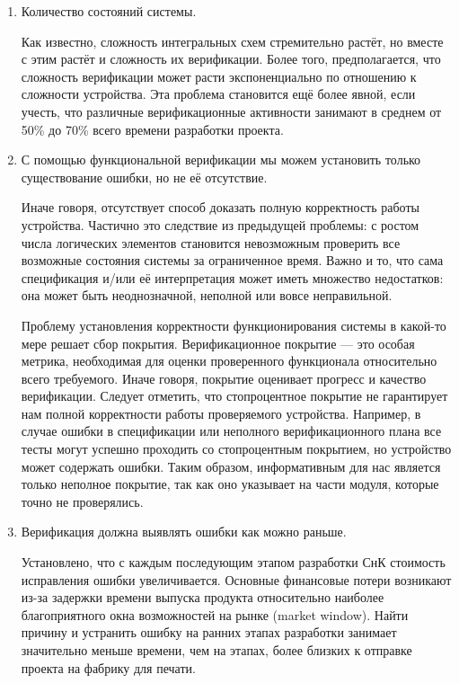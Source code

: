 \begin{enumerate}
	\item Количество состояний системы.
	
	Как известно, сложность интегральных схем стремительно растёт\cite{moore}, но вместе с этим растёт и сложность их верификации. Более того, предполагается, что сложность верификации может расти экспоненциально по отношению к сложности устройства\cite{appr_and_chall}. Эта проблема становится ещё более явной, если учесть, что различные верификационные активности занимают в среднем от 50\% до 70\% всего времени разработки проекта\cite{trends}. 
	
	\item С помощью функциональной верификации мы можем установить только существование ошибки, но не её отсутствие. 
	
	Иначе говоря, отсутствует способ доказать полную корректность работы устройства. Частично это следствие из предыдущей проблемы: с ростом числа логических элементов становится невозможным проверить все возможные состояния системы за ограниченное время. Важно и то, что сама спецификация и/или её интерпретация может иметь множество недостатков: она может быть неоднозначной, неполной или вовсе неправильной. 
	 
	Проблему установления корректности функционирования системы в какой-то мере решает сбор покрытия. Верификационное покрытие --- это особая метрика, необходимая для оценки проверенного функционала относительно всего требуемого. Иначе говоря, покрытие оценивает прогресс и качество верификации. Следует отметить, что стопроцентное покрытие не гарантирует нам полной корректности работы проверяемого устройства. Например, в случае ошибки в спецификации или неполного верификационного плана все тесты могут успешно проходить со стопроцентным покрытием, но устройство может содержать ошибки. Таким образом, информативным для нас является только неполное покрытие, так как оно указывает на части модуля, которые точно не проверялись.
	
	\item Верификация должна выявлять ошибки как можно раньше. 
	
	Установлено, что с каждым последующим этапом разработки СнК стоимость исправления ошибки увеличивается. Основные финансовые потери возникают из-за задержки времени выпуска продукта относительно наиболее благоприятного окна возможностей на рынке (market window)\cite{applied_formal}. Найти причину и устранить ошибку на ранних этапах разработки занимает значительно меньше времени, чем на этапах, более близких к отправке проекта на фабрику для печати.  
\end{enumerate}

